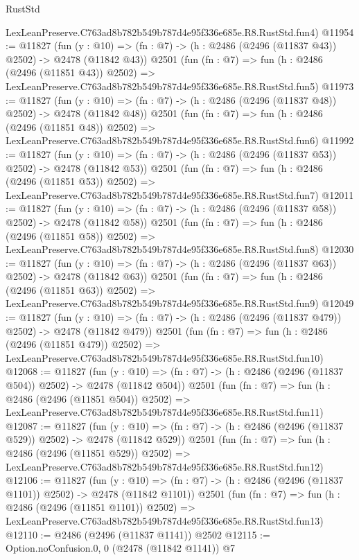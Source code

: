 \begin{lexlean}{RustStd}
\begin{coremodule}
    LexLeanPreserve.C763ad8b782b549b787d4e95f336e685e.R8.RustStd.fun4)
@11954 := @11827
    (fun (y : @10) => (fn : @7) -> (h : @2486 (@2496 (@11837 @43)) @2502) -> @2478 (@11842 @43))
    @2501
    (fun (fn : @7) =>
    fun (h : @2486 (@2496 (@11851 @43)) @2502) =>
    LexLeanPreserve.C763ad8b782b549b787d4e95f336e685e.R8.RustStd.fun5)
@11973 := @11827
    (fun (y : @10) => (fn : @7) -> (h : @2486 (@2496 (@11837 @48)) @2502) -> @2478 (@11842 @48))
    @2501
    (fun (fn : @7) =>
    fun (h : @2486 (@2496 (@11851 @48)) @2502) =>
    LexLeanPreserve.C763ad8b782b549b787d4e95f336e685e.R8.RustStd.fun6)
@11992 := @11827
    (fun (y : @10) => (fn : @7) -> (h : @2486 (@2496 (@11837 @53)) @2502) -> @2478 (@11842 @53))
    @2501
    (fun (fn : @7) =>
    fun (h : @2486 (@2496 (@11851 @53)) @2502) =>
    LexLeanPreserve.C763ad8b782b549b787d4e95f336e685e.R8.RustStd.fun7)
@12011 := @11827
    (fun (y : @10) => (fn : @7) -> (h : @2486 (@2496 (@11837 @58)) @2502) -> @2478 (@11842 @58))
    @2501
    (fun (fn : @7) =>
    fun (h : @2486 (@2496 (@11851 @58)) @2502) =>
    LexLeanPreserve.C763ad8b782b549b787d4e95f336e685e.R8.RustStd.fun8)
@12030 := @11827
    (fun (y : @10) => (fn : @7) -> (h : @2486 (@2496 (@11837 @63)) @2502) -> @2478 (@11842 @63))
    @2501
    (fun (fn : @7) =>
    fun (h : @2486 (@2496 (@11851 @63)) @2502) =>
    LexLeanPreserve.C763ad8b782b549b787d4e95f336e685e.R8.RustStd.fun9)
@12049 := @11827
    (fun (y : @10) => (fn : @7) -> (h : @2486 (@2496 (@11837 @479)) @2502) -> @2478 (@11842 @479))
    @2501
    (fun (fn : @7) =>
    fun (h : @2486 (@2496 (@11851 @479)) @2502) =>
    LexLeanPreserve.C763ad8b782b549b787d4e95f336e685e.R8.RustStd.fun10)
@12068 := @11827
    (fun (y : @10) => (fn : @7) -> (h : @2486 (@2496 (@11837 @504)) @2502) -> @2478 (@11842 @504))
    @2501
    (fun (fn : @7) =>
    fun (h : @2486 (@2496 (@11851 @504)) @2502) =>
    LexLeanPreserve.C763ad8b782b549b787d4e95f336e685e.R8.RustStd.fun11)
@12087 := @11827
    (fun (y : @10) => (fn : @7) -> (h : @2486 (@2496 (@11837 @529)) @2502) -> @2478 (@11842 @529))
    @2501
    (fun (fn : @7) =>
    fun (h : @2486 (@2496 (@11851 @529)) @2502) =>
    LexLeanPreserve.C763ad8b782b549b787d4e95f336e685e.R8.RustStd.fun12)
@12106 := @11827
    (fun (y : @10) => (fn : @7) -> (h : @2486 (@2496 (@11837 @1101)) @2502) -> @2478 (@11842 @1101))
    @2501
    (fun (fn : @7) =>
    fun (h : @2486 (@2496 (@11851 @1101)) @2502) =>
    LexLeanPreserve.C763ad8b782b549b787d4e95f336e685e.R8.RustStd.fun13)
@12110 := @2486 (@2496 (@11837 @1141)) @2502
@12115 := Option.noConfusion.{0, 0} (@2478 (@11842 @1141)) @7

\end{coremodule}
\end{lexlean}
